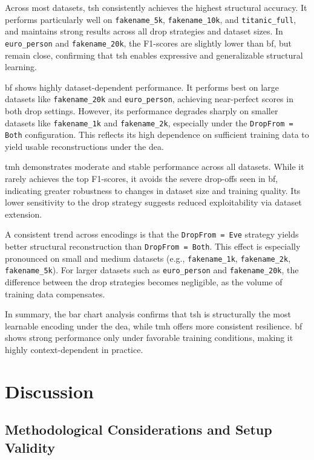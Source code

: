 Across most datasets, \ac{tsh} consistently achieves the highest structural accuracy.
It performs particularly well on \texttt{fakename\_5k}, \texttt{fakename\_10k}, and \texttt{titanic\_full}, and maintains strong results across all drop strategies and dataset sizes.
In \texttt{euro\_person} and \texttt{fakename\_20k}, the F1-scores are slightly lower than \ac{bf}, but remain close, confirming that \ac{tsh} enables expressive and generalizable structural learning.

\ac{bf} shows highly dataset-dependent performance.
It performs best on large datasets like \texttt{fakename\_20k} and \texttt{euro\_person}, achieving near-perfect scores in both drop settings.
However, its performance degrades sharply on smaller datasets like \texttt{fakename\_1k} and \texttt{fakename\_2k}, especially under the \texttt{DropFrom = Both} configuration.
This reflects its high dependence on sufficient training data to yield usable reconstructions under the \ac{dea}.

\ac{tmh} demonstrates moderate and stable performance across all datasets.
While it rarely achieves the top F1-scores, it avoids the severe drop-offs seen in \ac{bf}, indicating greater robustness to changes in dataset size and training quality.
Its lower sensitivity to the drop strategy suggests reduced exploitability via dataset extension.

A consistent trend across encodings is that the \texttt{DropFrom = Eve} strategy yields better structural reconstruction than \texttt{DropFrom = Both}.
This effect is especially pronounced on small and medium datasets (e.g., \texttt{fakename\_1k}, \texttt{fakename\_2k}, \texttt{fakename\_5k}).
For larger datasets such as \texttt{euro\_person} and \texttt{fakename\_20k}, the difference between the drop strategies becomes negligible, as the volume of training data compensates.

In summary, the bar chart analysis confirms that \ac{tsh} is structurally the most learnable encoding under the \ac{dea}, while \ac{tmh} offers more consistent resilience.
\ac{bf} shows strong performance only under favorable training conditions, making it highly context-dependent in practice.

\section{Discussion}  \label{sec:discussion}


\subsection{Methodological Considerations and Setup Validity}

